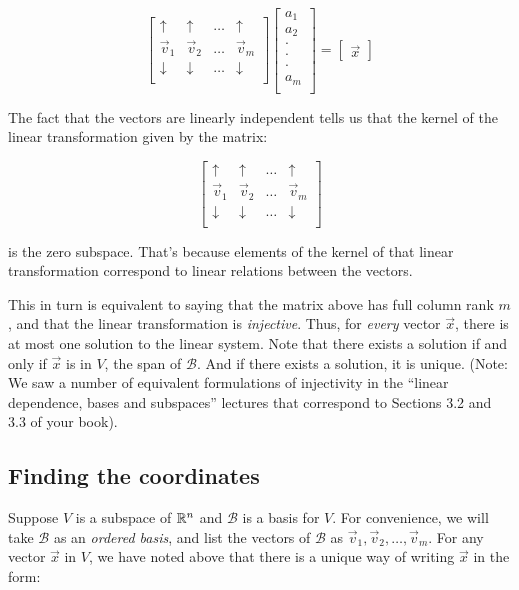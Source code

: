 \documentclass[10pt]{amsart}
\begin{document}
$$\left[\begin{matrix} \uparrow & \uparrow & \dots & \uparrow \\ \vec{v}_1 & \vec{v}_2 & \dots & \vec{v}_m \\ \downarrow & \downarrow & \dots & \downarrow \\\end{matrix}\right]\left[\begin{matrix} a_1 \\ a_2 \\ \cdot \\ \cdot \\ \cdot \\ a_m \\\end{matrix}\right] = \left[\begin{matrix} \vec{x} \end{matrix}\right]$$

The fact that the vectors are linearly independent tells us that the kernel of the linear transformation given by the matrix:

$$\left[\begin{matrix} \uparrow & \uparrow & \dots & \uparrow \\ \vec{v}_1 & \vec{v}_2 & \dots & \vec{v}_m \\ \downarrow & \downarrow & \dots & \downarrow \\\end{matrix}\right]$$

is the zero subspace. That's because elements of the kernel of that linear transformation correspond to linear relations between the vectors.

This in turn is equivalent to saying that the matrix above has full
column rank $m$, and that the linear transformation is {\em
  injective}. Thus, for {\em every} vector $\vec{x}$, there is at most
one solution to the linear system. Note that there exists a solution
if and only if $\vec{x}$ is in $V$, the span of $\mathcal{B}$. And if
there exists a solution, it is unique. (Note: We saw a number of
equivalent formulations of injectivity in the ``linear dependence,
bases and subspaces'' lectures that correspond to Sections 3.2 and 3.3
of your book).

\subsection{Finding the coordinates}

Suppose $V$ is a subspace of $\mathbb{R}^n$ and $\mathcal{B}$ is a basis for
$V$. For convenience, we will take $\mathcal{B}$ as an {\em ordered
  basis}, and list the vectors of $\mathcal{B}$ as $\vec{v}_1,
\vec{v}_2, \dots, \vec{v}_m$. For any vector $\vec{x}$ in $V$, we have
noted above that there is a unique way of writing $\vec{x}$ in the
form:
\end{document}
